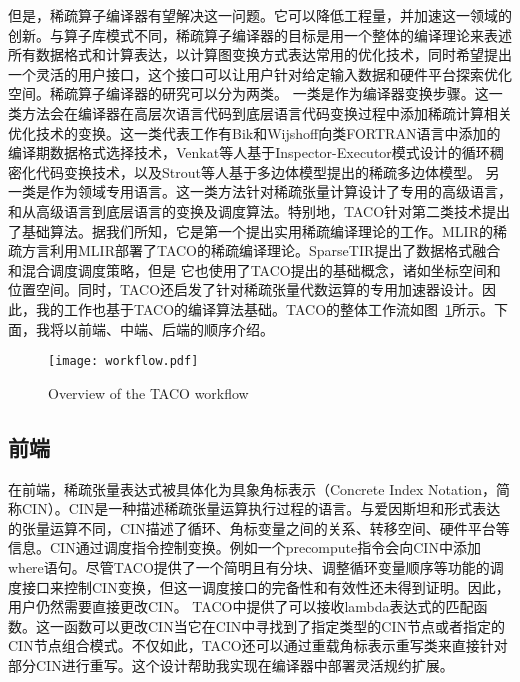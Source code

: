 但是，稀疏算子编译器有望解决这一问题。它可以降低工程量，并加速这一领域的创新。与算子库模式不同，稀疏算子编译器的目标是用一个整体的编译理论来表述所有数据格式和计算表达，以计算图变换方式表达常用的优化技术，同时希望提出一个灵活的用户接口，这个接口可以让用户针对给定输入数据和硬件平台探索优化空间。稀疏算子编译器的研究可以分为两类。
一类是作为编译器变换步骤。这一类方法会在编译器在高层次语言代码到底层语言代码变换过程中添加稀疏计算相关优化技术的变换。这一类代表工作有Bik和Wijshoff向类FORTRAN语言中添加的编译期数据格式选择技术\cite{bik1993compilation}，Venkat等人基于Inspector-Executor模式设计的循环稠密化代码变换技术，以及Strout等人基于多边体模型\cite{polyhedral}提出的稀疏多边体模型\cite{strout2018sparse}。
另一类是作为领域专用语言。这一类方法针对稀疏张量计算设计了专用的高级语言，和从高级语言到底层语言的变换及调度算法\cite{SparseTIR,kjolstad:2020:phd-thesis,bik2022compiler}。特别地，TACO\cite{kjolstad:2017:taco,kjolstad:2019:workspaces,kjolstad:2020:phd-thesis,senanayake:2020:scheduling}针对第二类技术提出了基础算法。据我们所知，它是第一个提出实用稀疏编译理论的工作。MLIR的稀疏方言\cite{bik2022compiler}利用MLIR部署了TACO的稀疏编译理论。SparseTIR\cite{SparseTIR}提出了数据格式融合和混合调度调度策略，但是
它也使用了TACO提出的基础概念，诸如坐标空间和位置空间。同时，TACO还启发了针对稀疏张量代数运算的专用加速器设计\cite{qin2022HardTACO}。因此，我的工作也基于TACO的编译算法基础。TACO的整体工作流如图~\ref{fig:tacoworkflow}所示。下面，我将以前端、中端、后端的顺序介绍。
\begin{figure}[h]%
  \centering
  \texttt{[image: workflow.pdf]}
  \caption{Overview of the TACO workflow}\label{fig:tacoworkflow}
\end{figure}
\subsection{前端}
在前端，稀疏张量表达式被具体化为具象角标表示（Concrete Index Notation，简称CIN）\cite{kjolstad:2019:workspaces}。CIN是一种描述稀疏张量运算执行过程的语言。与爱因斯坦和形式表达的张量运算不同，CIN描述了循环、角标变量之间的关系、转移空间、硬件平台等信息。CIN通过调度指令控制变换。例如一个precompute指令会向CIN中添加where语句。尽管TACO提供了一个简明且有分块、调整循环变量顺序等功能的调度接口来控制CIN变换，但这一调度接口的完备性和有效性还未得到证明\cite{ahrens:2022:autoscheduling}。因此，用户仍然需要直接更改CIN。
TACO中提供了可以接收lambda表达式的匹配函数。这一函数可以更改CIN当它在CIN中寻找到了指定类型的CIN节点或者指定的CIN节点组合模式。不仅如此，TACO还可以通过重载角标表示重写类来直接针对部分CIN进行重写。这个设计帮助我实现在编译器中部署灵活规约扩展。
